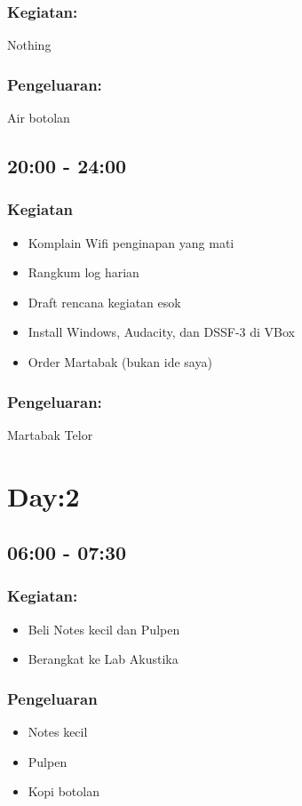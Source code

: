 \documentclass[12pt,]{article}
\begin{document}
	\subsubsection{Kegiatan:}
	Nothing
	\subsubsection{Pengeluaran:}
	Air botolan
	
	\subsection{20:00 - 24:00}
	\subsubsection{Kegiatan}
	\begin{itemize}
		\item Komplain Wifi penginapan yang mati
		\item Rangkum log harian
		\item Draft rencana kegiatan esok
		\item Install Windows, Audacity, dan DSSF-3 di VBox
		\item Order Martabak (bukan ide saya) 
	\end{itemize}

	\subsubsection{Pengeluaran:}
	Martabak Telor
	
	\newpage
	\section{Day:2}
	
	\subsection{06:00 - 07:30}
	\subsubsection{Kegiatan:}
	\begin{itemize}
		\item Beli Notes kecil dan Pulpen
		\item Berangkat ke Lab Akustika
	\end{itemize}
	
	\subsubsection{Pengeluaran}
	\begin{itemize}
		\item Notes kecil
		\item Pulpen
		\item Kopi botolan
	\end{itemize}
\end{document}
